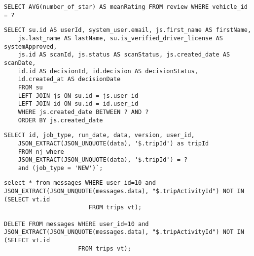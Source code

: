 \begin{lstlisting}[caption={SQL Query example}]
SELECT AVG(number_of_star) AS meanRating FROM review WHERE vehicle_id = ?
\end{lstlisting}

\begin{lstlisting}[caption={SQL Query example verification}]
SELECT su.id AS userId, system_user.email, js.first_name AS firstName,
    js.last_name AS lastName, su.is_verified_driver_license AS systemApproved,
    js.id AS scanId, js.status AS scanStatus, js.created_date AS scanDate,
    id.id AS decisionId, id.decision AS decisionStatus,
    id.created_at AS decisionDate
    FROM su
    LEFT JOIN js ON su.id = js.user_id
    LEFT JOIN id ON su.id = id.user_id
    WHERE js.created_date BETWEEN ? AND ?
    ORDER BY js.created_date
\end{lstlisting}

\begin{lstlisting}[caption={SQL query to get entry from json data}]
SELECT id, job_type, run_date, data, version, user_id,
    JSON_EXTRACT(JSON_UNQUOTE(data), '$.tripId') as tripId
    FROM nj where
    JSON_EXTRACT(JSON_UNQUOTE(data), '$.tripId') = ?
    and (job_type = 'NEW')`;
\end{lstlisting}

\begin{lstlisting}[caption={SQL query to delete from row where activityId is not in table}]
select * from messages WHERE user_id=10 and  JSON_EXTRACT(JSON_UNQUOTE(messages.data), "$.tripActivityId") NOT IN (SELECT vt.id 
                        FROM trips vt);
                        
DELETE FROM messages WHERE user_id=10 and  JSON_EXTRACT(JSON_UNQUOTE(messages.data), "$.tripActivityId") NOT IN (SELECT vt.id 
                     FROM trips vt);
\end{lstlisting}
